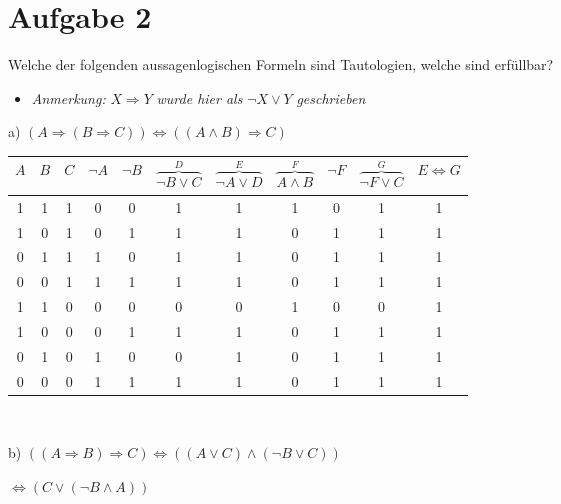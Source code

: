 \section*{Aufgabe 2}

Welche der folgenden aussagenlogischen Formeln sind Tautologien, welche sind erfüllbar?\\

\begin{itemize}[leftmargin=*]
\item \textit{Anmerkung:} $X \Rightarrow Y$ \textit{wurde hier als} $\lnot X \lor Y$ \textit{geschrieben}
\end{itemize}

a) $(A \Rightarrow (B \Rightarrow C)) \Leftrightarrow ((A \land B) \Rightarrow C)$\\


\begin{table}[h]
\centering
\begin{tabular}{c|c|c|c|c|c|c|c|c|c|c}
$A$ & $B$ & $C$ & $\lnot A$ & $\lnot B$ & $\overbrace{\lnot B \lor C}^{D}$ & $\overbrace{\lnot A \lor D}^{E}$ & $\overbrace{A \land B}^{F}$ & $\lnot F$ & $\overbrace{\lnot F \lor C}^{G}$ & $E \Leftrightarrow G$\\
\hline
1 & 1 & 1 & 0 & 0 & 1 & 1 & 1 & 0 & 1 & 1\\
1 & 0 & 1 & 0 & 1 & 1 & 1 & 0 & 1 & 1 & 1\\
0 & 1 & 1 & 1 & 0 & 1 & 1 & 0 & 1 & 1 & 1\\
0 & 0 & 1 & 1 & 1 & 1 & 1 & 0 & 1 & 1 & 1\\
1 & 1 & 0 & 0 & 0 & 0 & 0 & 1 & 0 & 0 & 1\\
1 & 0 & 0 & 0 & 1 & 1 & 1 & 0 & 1 & 1 & 1\\
0 & 1 & 0 & 1 & 0 & 0 & 1 & 0 & 1 & 1 & 1\\
0 & 0 & 0 & 1 & 1 & 1 & 1 & 0 & 1 & 1 & 1
\end{tabular}
\end{table}\

b) $((A \Rightarrow B) \Rightarrow C) \Leftrightarrow ((A \lor C) \land (\lnot B \lor C))$

\hspace{3.57cm}$\Leftrightarrow (C \lor (\lnot B \land A))$

